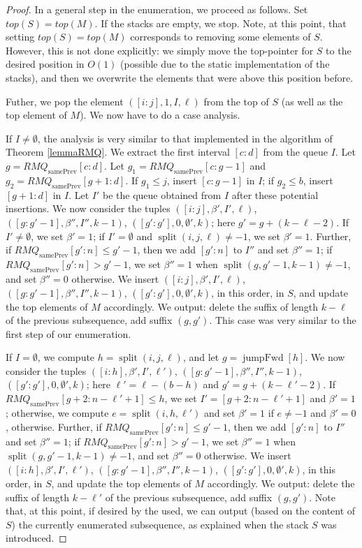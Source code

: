 \documentclass[runningheads,UKenglish,cleveref, autoref, thm-restate]{llncs}
\DeclareMathOperator{\splitt}{split}
\DeclareMathOperator{\prevArray}{samePrev}
\DeclareMathOperator{\jumpAhead}{{jumpFwd}}
\begin{document}
\begin{proof}
In a general step in the enumeration, we proceed as follows. Set $top(S)=top(M)$. If the stacks are empty, we stop. Note, at this point, that setting $top(S)=top(M)$ corresponds to removing some elements of $S$. However, this is not done explicitly: we simply move the top-pointer for $S$ to the desired position in $O(1)$ (possible due to the static implementation of the stacks), and then we overwrite the elements that were above this position before.

Futher, we pop the element $([i:j],1,I,\ell)$ from the top of $S$ (as well as the top element of $M$). We now have to do a case analysis. 

If $I\neq \emptyset$, the analysis is very similar to that implemented in the algorithm of Theorem \ref{lemmaRMQ}. We extract the first interval $[c:d]$ from the queue $I$. Let $g=RMQ_{\prevArray}[c:d]$. Let $g_1=RMQ_{\prevArray}[c:g-1]$ and $g_2=RMQ_{\prevArray}[g+1:d]$. If $g_1\leq j$, insert $[c:g-1]$ in $I$; if $g_2\leq b$, insert $[g+1:d]$ in $I$. Let $I'$ be the queue obtained from $I$ after these potential insertions. We now consider the tuples $([i:j],\beta',I',\ell)$, $([g:g'-1],\beta'', I'', k-1)$, $([g':g'],0, \emptyset', k)$; here $g'=g+(k-\ell-2)$. If $I'\neq \emptyset$, we set $\beta'=1$; if $I'=\emptyset$ and $\splitt(i,j,\ell)\neq -1$, we set $\beta'=1$. Further, if $RMQ_{\prevArray}[g':n]\leq g'-1$, then we add $[g':n]$ to $I''$ and set $\beta''=1$; if $RMQ_{\prevArray}[g':n]> g'-1$, we set $\beta''=1$ when $\splitt(g,g'-1,k-1)\neq -1$, and set $\beta''=0$ otherwise. We insert $([i:j],\beta',I',\ell)$, $([g:g'-1],\beta'', I'', k-1)$, $([g':g'],0, \emptyset', k)$, in this order, in $S$, and update the top elements of $M$ accordingly. We output: delete the suffix of length $k-\ell$ of the previous subsequence, add suffix $(g,g')$. This case was very similar to the first step of our enumeration. 

If $I= \emptyset$, we compute $h=\splitt(i,j,\ell)$, and let $g=\jumpAhead[h]$. We now consider the tuples $([i:h],\beta',I',\ell')$, $([g:g'-1],\beta'', I'', k-1)$, $([g':g'],0, \emptyset', k)$; here $\ell'=\ell-(b-h)$ and $g'=g+(k-\ell'-2)$. 
If $RMQ_{\prevArray}[g+2:n-\ell'+1] \leq h$, we set $I'=[g+2:n-\ell'+1]$ and $\beta'=1$; otherwise, we compute $e=\splitt(i,h,\ell')$ and set $\beta'=1$ if $e\neq -1$ and $\beta'=0$, otherwise.
Further, if $RMQ_{\prevArray}[g':n]\leq g'-1$, then we add $[g':n]$ to $I''$ and set $\beta''=1$; if $RMQ_{\prevArray}[g':n]> g'-1$, we set $\beta''=1$ when $\splitt(g,g'-1,k-1)\neq -1$, and set $\beta''=0$ otherwise. 
We insert $([i:h],\beta',I',\ell')$, $([g:g'-1],\beta'', I'', k-1)$, $([g':g'],0, \emptyset', k)$, in this order, in $S$, and update the top elements of $M$ accordingly. We output: delete the suffix of length $k-\ell'$ of the previous subsequence, add suffix $(g,g')$. Note that, at this point, if desired by the used, we can output (based on the content of $S$) the currently enumerated subsequence, as explained when the stack $S$ was introduced.


\end{proof}
\end{document}
